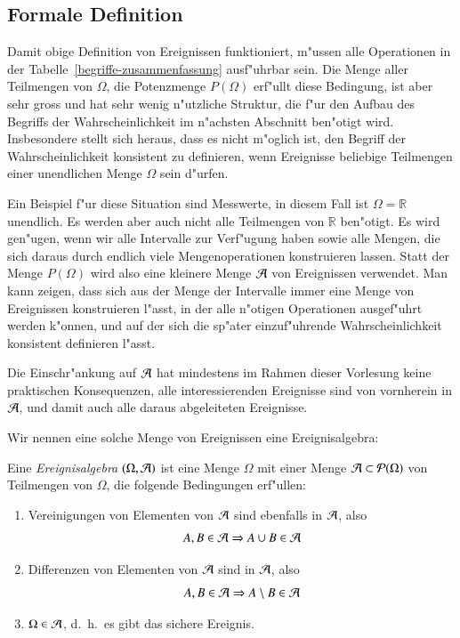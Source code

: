 \subsection{Formale Definition}
Damit obige Definition von Ereignissen funktioniert, m"ussen
alle Operationen in der Tabelle~\ref{begriffe-zusammenfassung}
ausf"uhrbar sein.
Die Menge aller Teilmengen von $\Omega$, die Potenzmenge
$P(\Omega)$ erf"ullt diese Bedingung,
ist aber sehr gross und hat sehr wenig n"utzliche Struktur, die
f"ur den Aufbau des Begriffs der Wahrscheinlichkeit im n"achsten
Abschnitt ben"otigt wird.
Insbesondere stellt sich heraus, dass es nicht m"oglich ist,
den Begriff der Wahrscheinlichkeit konsistent zu definieren, wenn
Ereignisse beliebige Teilmengen einer unendlichen Menge $\Omega$
sein d"urfen.

Ein Beispiel f"ur diese Situation sind Messwerte, in diesem
Fall ist $\Omega=\mathbb R$ unendlich.
Es werden aber auch nicht alle Teilmengen von $\mathbb R$ ben"otigt.
Es wird gen"ugen, wenn wir alle Intervalle zur Verf"ugung haben sowie
alle Mengen, die sich daraus durch endlich viele Mengenoperationen
konstruieren lassen.
Statt der Menge $P(\Omega)$ wird also eine kleinere Menge $\cal A$
von Ereignissen verwendet.
Man kann zeigen, dass sich aus der Menge der Intervalle immer 
eine Menge von Ereignissen konstruieren l"asst, in der alle
n"otigen Operationen ausgef"uhrt werden k"onnen, und auf der sich
die sp"ater einzuf"uhrende Wahrscheinlichkeit konsistent definieren
l"asst.

Die Einschr"ankung auf $\cal A$ hat mindestens im Rahmen dieser
Vorlesung keine praktischen Konsequenzen, alle interessierenden
Ereignisse sind von vornherein in $\cal A$, und damit auch alle daraus
abgeleiteten Ereignisse.

Wir nennen eine solche Menge von Ereignissen eine Ereignisalgebra:

\begin{definition}
\label{def-ereignisalgebra}
Eine {\em Ereignisalgebra} $(\Omega,{\cal A})$ ist
eine Menge $\Omega$ mit einer Menge ${\cal A }\subset{\cal P}(\Omega)$
von Teilmengen von $\Omega$, die folgende Bedingungen erf"ullen:
\begin{enumerate}
\item Vereinigungen von Elementen von ${\cal A}$ sind ebenfalls in ${\cal A}$,
also
\[
A,B\in {\cal A}\Rightarrow A\cup B\in{\cal A}
\]
\item Differenzen von Elementen von ${\cal A}$ sind in ${\cal A}$, also
\[
A,B\in {\cal A}\Rightarrow A\setminus B\in{\cal A}
\]
\item $\Omega\in{\cal A}$, d.~h.~es gibt das sichere Ereignis.
\end{enumerate}
\end{definition}


